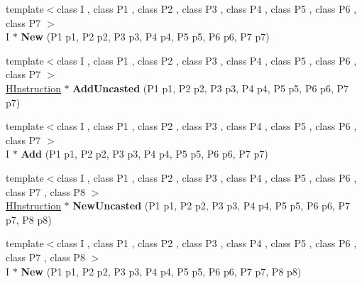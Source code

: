 \begin{DoxyCompactItemize}
\item 
{\footnotesize template$<$class I , class P1 , class P2 , class P3 , class P4 , class P5 , class P6 , class P7 $>$ }\\I $\ast$ {\bfseries New} (P1 p1, P2 p2, P3 p3, P4 p4, P5 p5, P6 p6, P7 p7)\hypertarget{classv8_1_1internal_1_1_h_graph_builder_a3fc0a007550890edb1b3cd59a1aacb75}{}\label{classv8_1_1internal_1_1_h_graph_builder_a3fc0a007550890edb1b3cd59a1aacb75}

\item 
{\footnotesize template$<$class I , class P1 , class P2 , class P3 , class P4 , class P5 , class P6 , class P7 $>$ }\\\hyperlink{classv8_1_1internal_1_1_h_instruction}{H\+Instruction} $\ast$ {\bfseries Add\+Uncasted} (P1 p1, P2 p2, P3 p3, P4 p4, P5 p5, P6 p6, P7 p7)\hypertarget{classv8_1_1internal_1_1_h_graph_builder_aa718fe1dc95a7444fa2107df39686b67}{}\label{classv8_1_1internal_1_1_h_graph_builder_aa718fe1dc95a7444fa2107df39686b67}

\item 
{\footnotesize template$<$class I , class P1 , class P2 , class P3 , class P4 , class P5 , class P6 , class P7 $>$ }\\I $\ast$ {\bfseries Add} (P1 p1, P2 p2, P3 p3, P4 p4, P5 p5, P6 p6, P7 p7)\hypertarget{classv8_1_1internal_1_1_h_graph_builder_ac2839044c0a2fe5f7bd848c34a6ab991}{}\label{classv8_1_1internal_1_1_h_graph_builder_ac2839044c0a2fe5f7bd848c34a6ab991}

\item 
{\footnotesize template$<$class I , class P1 , class P2 , class P3 , class P4 , class P5 , class P6 , class P7 , class P8 $>$ }\\\hyperlink{classv8_1_1internal_1_1_h_instruction}{H\+Instruction} $\ast$ {\bfseries New\+Uncasted} (P1 p1, P2 p2, P3 p3, P4 p4, P5 p5, P6 p6, P7 p7, P8 p8)\hypertarget{classv8_1_1internal_1_1_h_graph_builder_a4cff9fb7728d794b326cc12ec3ca084c}{}\label{classv8_1_1internal_1_1_h_graph_builder_a4cff9fb7728d794b326cc12ec3ca084c}

\item 
{\footnotesize template$<$class I , class P1 , class P2 , class P3 , class P4 , class P5 , class P6 , class P7 , class P8 $>$ }\\I $\ast$ {\bfseries New} (P1 p1, P2 p2, P3 p3, P4 p4, P5 p5, P6 p6, P7 p7, P8 p8)\hypertarget{classv8_1_1internal_1_1_h_graph_builder_addca06fd25b3481255bc25e2adc1358c}{}\label{classv8_1_1internal_1_1_h_graph_builder_addca06fd25b3481255bc25e2adc1358c}


\end{DoxyCompactItemize}
